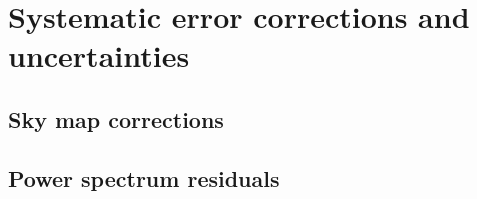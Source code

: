 \documentclass[twocolumn]{../../common/aa}
\begin{document}


\clearpage

\section{Systematic error corrections and uncertainties}
\label{sec:systematics}

\subsection{Sky map corrections}



\subsection{Power spectrum residuals}
\end{document}
